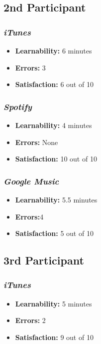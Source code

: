 \documentclass{article}
\begin{document}
\begin{multicols}{2}
\subsection{2nd Participant}

\subsubsection{\it iTunes}
\begin{itemize}
	\item {\bf Learnability:} 6 minutes
	\item {\bf Errors:}  3
	\item {\bf Satisfaction:} 6 out of 10 
\end{itemize}

\subsubsection{\it Spotify}
\begin{itemize}
	\item {\bf Learnability:} 4 minutes
	\item {\bf Errors:} None
	\item {\bf Satisfaction:} 10 out of 10 
\end{itemize}

\subsubsection{\it Google Music}
\begin{itemize}
\item {\bf Learnability:} 5.5 minutes
	\item {\bf Errors:}4 
	\item {\bf Satisfaction:} 5 out of 10 
\end{itemize}

\subsection{3rd Participant}

\subsubsection{\it iTunes}
\begin{itemize}
	\item {\bf Learnability:} 5 minutes
	\item {\bf Errors:}  2
	\item {\bf Satisfaction:} 9 out of 10 
\end{itemize}


\end{multicols}
\end{document}
